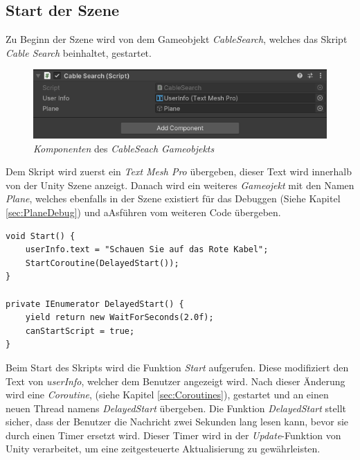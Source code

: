 \subsection{Start der Szene}
Zu Beginn der Szene wird von dem Gameobjekt \textit{CableSearch}, welches das Skript \textit{Cable Search} beinhaltet, gestartet.
\begin{figure}[H]
    \centering
    \includegraphics[scale=0.7]{images/CableSearchObjekt.png}
    \caption{\textit{Komponenten} des \textit{CableSeach} \textit{Gameobjekts}}
    \label{fig:CableSearchObjekt}
\end{figure}
Dem Skript wird zuerst ein \textit{Text Mesh Pro} übergeben, dieser Text wird innerhalb von der Unity Szene anzeigt. Danach wird ein weiteres \textit{Gameojekt} mit den Namen \textit{Plane}, welches ebenfalls in der Szene existiert für das Debuggen (Siehe Kapitel \ref{sec:PlaneDebug}) und aAsführen vom weiteren Code übergeben.
\begin{lstlisting}[style=csharp, caption={Start des \textit{CableSearch} Skripts}, label=code:CableSearch]
void Start() {
    userInfo.text = "Schauen Sie auf das Rote Kabel";
    StartCoroutine(DelayedStart());
}

private IEnumerator DelayedStart() {
    yield return new WaitForSeconds(2.0f);
    canStartScript = true;
}
\end{lstlisting}
Beim Start des Skripts wird die Funktion \textit{Start} aufgerufen. Diese modifiziert den Text von \textit{userInfo}, welcher dem Benutzer angezeigt wird. Nach dieser Änderung wird eine \textit{Coroutine}, (siehe Kapitel \ref{sec:Coroutines}), gestartet und an einen neuen Thread namens \textit{DelayedStart} übergeben. Die Funktion \textit{DelayedStart} stellt sicher, dass der Benutzer die Nachricht zwei Sekunden lang lesen kann, bevor sie durch einen Timer ersetzt wird. Dieser Timer wird in der \textit{Update}-Funktion von Unity verarbeitet, um eine zeitgesteuerte Aktualisierung zu gewährleisten.
